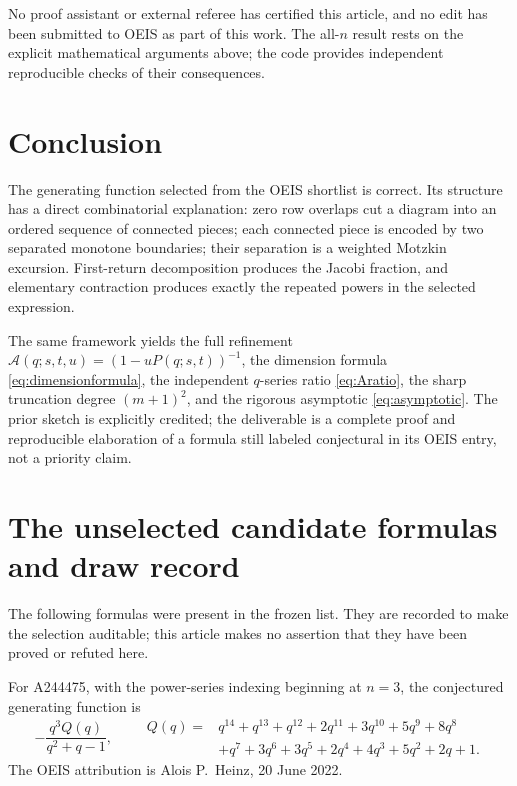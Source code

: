 \documentclass[11pt,letterpaper]{article}
\numberwithin{equation}{section}
\theoremstyle{definition}
\newcommand{\Aall}{\mathcal A}
\begin{document}
No proof assistant or external referee has certified this article, and no
edit has been submitted to OEIS as part of this work. The all-$n$ result
rests on the explicit mathematical arguments above; the code provides
independent reproducible checks of their consequences.

\section{Conclusion}
The generating function selected from the OEIS shortlist is correct.
Its structure has a direct combinatorial explanation: zero row overlaps
cut a diagram into an ordered sequence of connected pieces; each connected
piece is encoded by two separated monotone boundaries; their separation
is a weighted Motzkin excursion. First-return decomposition produces the
Jacobi fraction, and elementary contraction produces exactly the repeated
powers in the selected expression.

The same framework yields the full refinement
$\Aall(q;s,t,u)=(1-uP(q;s,t))^{-1}$, the dimension formula
\eqref{eq:dimensionformula}, the independent $q$-series ratio
\eqref{eq:Aratio}, the sharp truncation degree $(m+1)^2$, and the rigorous
asymptotic \eqref{eq:asymptotic}. The prior sketch is explicitly credited;
the deliverable is a complete proof and reproducible elaboration of a
formula still labeled conjectural in its OEIS entry, not a priority claim.

\appendix
\section{The unselected candidate formulas and draw record}
\label{app:candidates}

The following formulas were present in the frozen list. They are recorded
to make the selection auditable; this article makes no assertion that they
have been proved or refuted here.

For A244475, with the power-series indexing beginning at $n=3$, the
conjectured generating function is \cite{oeis244475}
\begin{equation}
 -\frac{q^3 Q(q)}{q^2+q-1},
 \qquad
 \begin{aligned}
 Q(q)={}&q^{14}+q^{13}+q^{12}+2q^{11}+3q^{10}+5q^9+8q^8\\
       &+q^7+3q^6+3q^5+2q^4+4q^3+5q^2+2q+1.
 \end{aligned}
 \label{eq:candidateStern}
\end{equation}
The OEIS attribution is Alois P.\ Heinz, 20 June 2022.
\end{document}
